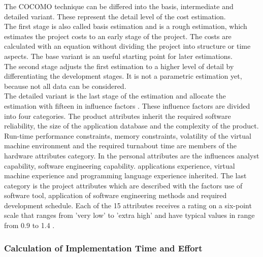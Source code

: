 The COCOMO technique can be differed into the basis, intermediate and detailed variant. These represent the detail level of the cost estimation.\\
The first stage is also called basis estimation and is a rough estimation, which estimates the project costs to an early stage of the project. The costs are calculated with an equation without dividing the project into structure or time aspects. The base variant is an useful starting point for later estimations.\\
The second stage adjusts the first estimation to a higher level of detail by differentiating the development stages. It is not a parametric estimation yet, because not all data can be considered.\\
The detailed variant is the last stage of the estimation and allocate the estimation with fifteen in influence factors \cite{jenny}. These influence factors are divided into four categories. The product attributes inherit the required software reliability, the size of the application database and the complexity of the product. Run-time performance constraints, memory constraints, volatility of the virtual machine environment and the required turnabout time are members of the hardware attributes category. In the personal attributes are the influences analyst capability, software engineering capability. applications experience, virtual machine experience and programming language experience inherited. The last category is the project attributes which are described with the factors use of software tool, application of software engineering methods and required development schedule. Each of the 15 attributes receives a rating on a six-point scale that ranges from 'very low' to 'extra high' and have typical values in range from 0.9 to 1.4 .\\

\subsubsection{Calculation of Implementation Time and Effort}

